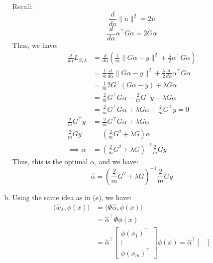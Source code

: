 \documentclass{amsart}
\theoremstyle{definition}
\begin{document}
\begin{enumerate}[(a)]
    Recall:
    \[
    \frac{d}{d u} \|u\|^2 = 2u
    \]
    \[
    \frac{d}{d\alpha} \alpha^\intercal G \alpha = 2G\alpha
    \]
    Thus, we have:
    \begin{align*}
      \frac{d }{d\alpha} L_{S, \lambda} &= \frac{d}{d\alpha} \left(\frac1{m} \|G\alpha - y\|^2 + \displaystyle\frac{\lambda }{2}\alpha^\intercal G \alpha\right)\\
                                        &= \frac1{m} \frac{d}{d\alpha} \|G\alpha - y\|^2 + \displaystyle\frac{\lambda }{2}\frac{d}{d\alpha} \alpha^\intercal G \alpha\\
                                        &= \frac1{m} 2G^\intercal (G\alpha - y) + \lambda G\alpha\\
                                        &= \frac2{m} G^\intercal G\alpha - \frac2{m} G^\intercal y + \lambda G\alpha\\
                                        &= \frac2{m} G^\intercal G\alpha + \lambda G\alpha - \frac2{m} G^\intercal y = 0\\
      \frac2{m} G^\intercal y &=  \frac2{m} G^\intercal G\alpha + \lambda G\alpha  \\
      \frac2{m} G y &= \left(\frac2{m} G^2 + \lambda G\right)\alpha\\
      \implies \alpha &= \left(\frac2{m} G^2 + \lambda G\right)^{-1} \frac2{m} G y
    \end{align*}
    Thus, this is the optimal $\alpha$, and we have:
    \[
    \hat{\alpha} = \left(\frac2{m} G^2 + \lambda G\right)^{-1} \frac2{m} G y
    \]
    \item 
      Using the same idea as in (e), we have: 
      \begin{align*}
        \langle \hat{w}_\lambda , \phi(x)\rangle &= \langle \Phi \hat{\alpha}, \phi(x)\rangle\\
                                                 &= \hat{\alpha}^\intercal \Phi \phi(x)\\
                                                 &= \hat{\alpha}^\intercal \begin{bmatrix}
                                                  \phi(x_1)^\intercal \\
                                                  \vdots \\
                                                  \phi(x_m)^\intercal
                                                 \end{bmatrix} \phi(x) = \hat{\alpha}^\intercal \begin{bmatrix}

\end{bmatrix}
\end{align*}
\end{enumerate}
\end{document}
